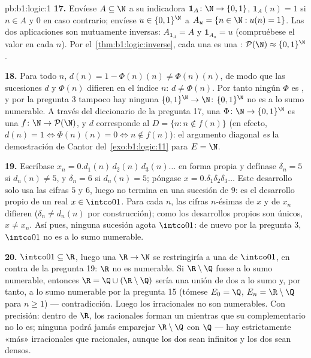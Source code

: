 \begin{solution}{pb:b1:logic:1}
\textbf{17.} Envíese $A \subseteq \N$ a su indicadora $\mathbf 1_A
\colon \N \to \{0,1\}$, $\mathbf 1_A(n) = 1$ si $n \in A$ y $0$ en caso
contrario; envíese $u \in \{0,1\}^{\N}$ a $A_u = \{n \in \N : u(n) =
1\}$. Las dos aplicaciones son mutuamente inversas:
$A_{\mathbf 1_A} = A$ y $\mathbf 1_{A_u} = u$ (compruébese el valor en
cada $n$). Por el~\cref{thm:b1:logic:inverse}, cada una es una
: $\mathcal{P}(\N) \approx \{0,1\}^{\N}$.

\textbf{18.} Para todo $n$, $d(n) = 1 - \Phi(n)(n) \neq \Phi(n)(n)$,
de modo que las sucesiones $d$ y $\Phi(n)$ difieren en el índice $n$:
$d \neq \Phi(n)$. Por tanto ningún $\Phi$ es , y por la
pregunta 3 tampoco hay ninguna  $\{0,1\}^{\N} \to \N$:
$\{0,1\}^{\N}$ no es a lo sumo numerable. A través del diccionario de
la pregunta 17, una  $\Phi \colon \N \to \{0,1\}^{\N}$ es
una  $f \colon \N \to \mathcal{P}(\N)$, y $d$ corresponde al
 $D = \{n : n \notin f(n)\}$ (en efecto,
$d(n) = 1 \iff \Phi(n)(n) = 0 \iff n \notin f(n)$): el argumento
diagonal \emph{es} la demostración de Cantor del~\cref{exo:b1:logic:11}
para $E = \N$.

\textbf{19.} Escríbase $x_n = 0.d_1(n)\,d_2(n)\,d_3(n)\dots$ en forma
propia y defínase $\delta_n = 5$ si $d_n(n) \neq 5$, y $\delta_n = 6$
si $d_n(n) = 5$; póngase $x = 0.\delta_1\delta_2\delta_3\dots$ Este
desarrollo solo usa las cifras $5$ y $6$, luego no termina en una
sucesión de $9$: es el desarrollo propio de un real $x \in \intco01$.
Para cada $n$, las cifras $n$-ésimas de $x$ y de $x_n$ difieren
($\delta_n \neq d_n(n)$ por construcción); como los desarrollos propios
son únicos, $x \neq x_n$. Así pues, ninguna sucesión agota $\intco01$:
de nuevo por la pregunta 3, $\intco01$ no es a lo sumo numerable.

\textbf{20.} $\intco01 \subseteq \R$, luego una  $\R \to \N$
se restringiría a una de $\intco01$, en contra de la pregunta 19: $\R$
no es numerable. Si $\R \setminus \Q$ fuese a lo sumo numerable,
entonces $\R = \Q \cup (\R \setminus \Q)$ sería una unión de dos
 a lo sumo y, por tanto, a lo sumo numerable por la
pregunta 15 (tómese $E_0 = \Q$, $E_n = \R \setminus \Q$ para
$n \geq 1$) --- contradicción. Luego los irracionales no son
numerables. Con precisión: dentro de $\R$, los racionales forman un
 mientras que su complementario no lo es; ninguna
 podrá jamás emparejar $\R \setminus \Q$ con $\Q$ --- hay
estrictamente «más» irracionales que racionales, aunque los dos
 sean infinitos y los dos sean densos.


\end{solution}
